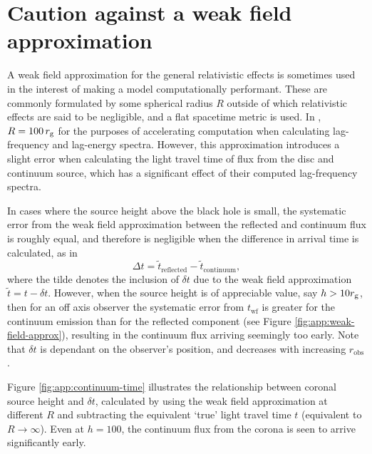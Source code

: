\section{Caution against a weak field approximation}
\label{appendix:continuum-time}

A weak field approximation for the general relativistic effects is sometimes used in the interest of making a model computationally performant. These are commonly formulated by some spherical radius $R$ outside of which relativistic effects are said to be negligible, and a flat spacetime metric is used. In \cite{cackett_modelling_2014}, $R = 100\, r_\text{g}$ for the purposes of accelerating computation when calculating lag-frequency and lag-energy spectra. However, this approximation introduces a slight error when calculating the light travel time of flux from the disc and continuum source, which has a significant effect of their computed lag-frequency spectra.

In cases where the source height above the black hole is small, the systematic error from the weak field approximation between the reflected and continuum flux is roughly equal, and therefore is negligible when the difference in arrival time is calculated, as in
\begin{equation}
    \Delta t = \tilde{t}_\text{reflected} - \tilde{t}_\text{continuum} ,
\end{equation}
where the tilde denotes the inclusion of $\delta t$ due to the weak field approximation $\tilde{t} = t - \delta t$. However, when the source height is of appreciable value, say $h > 10r_\text{g}$, then for an off axis observer the systematic error from $t_\text{wf}$ is greater for the continuum emission than for the reflected component (see Figure \ref{fig:app:weak-field-approx}), resulting in the continuum flux arriving seemingly too early. Note that $\delta t$ is dependant on the observer's position, and decreases with increasing $r_\text{obs}$. 

Figure \ref{fig:app:continuum-time} illustrates the relationship between coronal source height and $\delta t$, calculated by using the weak field approximation at different $R$ and subtracting the equivalent `true' light travel time $t$ (equivalent to $R \rightarrow \infty$). Even at $h = 100$, the continuum flux from the corona is seen to arrive significantly early.

